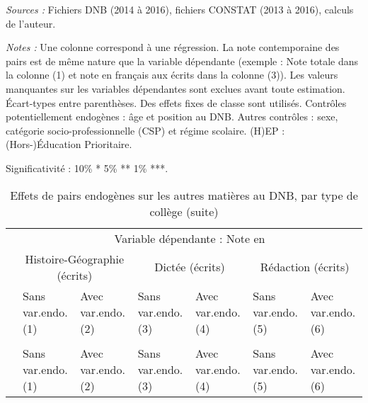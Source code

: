 \documentclass[
]{book}
\begin{document}
\begin{ThreePartTable}
\begin{TableNotes}
\item \textit{Sources :} Fichiers DNB (2014 à 2016), fichiers CONSTAT (2013 à 2016), calculs de l'auteur.
\item \textit{Notes :} Une colonne correspond à une régression. La note contemporaine des pairs est de même nature que la variable dépendante (exemple : Note totale dans la colonne (1) et note en français aux écrits dans la colonne (3)). Les valeurs manquantes sur les variables dépendantes sont exclues avant toute estimation. Écart-types entre parenthèses. Des effets fixes de classe sont utilisés. Contrôles potentiellement endogènes : âge et position au DNB. Autres contrôles : sexe, catégorie socio-professionnelle (CSP) et régime scolaire. (H)EP : (Hors-)Éducation Prioritaire.
\item Significativité : 10\% * 5\% ** 1\% ***.
\end{TableNotes}
\begin{longtable}[t]{lllllll}
\caption{\label{tab:pepcmlmodelsssmoystatutreseau}Effets de pairs endogènes sur les autres matières au DNB, par type de collège}\\
\toprule
\multicolumn{1}{c}{} & \multicolumn{6}{c}{Variable dépendante : Note en} \\
\cmidrule(l{3pt}r{3pt}){2-7}
\multicolumn{1}{c}{} & \multicolumn{2}{c}{Histoire-Géographie (écrits)} & \multicolumn{2}{c}{Dictée (écrits)} & \multicolumn{2}{c}{Rédaction (écrits)} \\
\cmidrule(l{3pt}r{3pt}){2-3} \cmidrule(l{3pt}r{3pt}){4-5} \cmidrule(l{3pt}r{3pt}){6-7}
 & \makecell{Sans var.endo. \\ (1) } & \makecell{Avec var.endo. \\ (2) } & \makecell{Sans var.endo. \\ (3) } & \makecell{Avec var.endo. \\ (4) } & \makecell{Sans var.endo. \\ (5) } & \makecell{Avec var.endo. \\ (6) }\\
\midrule
\endfirsthead
\caption[]{\label{tab:pepcmlmodelsssmoystatutreseau}Effets de pairs endogènes sur les autres matières au DNB, par type de collège (suite)}\\
\toprule
 & \makecell{Sans var.endo. \\ (1) } & \makecell{Avec var.endo. \\ (2) } & \makecell{Sans var.endo. \\ (3) } & \makecell{Avec var.endo. \\ (4) } & \makecell{Sans var.endo. \\ (5) } & \makecell{Avec var.endo. \\ (6) }\\
\midrule
\endhead


\end{longtable}
\end{ThreePartTable}
\end{document}
